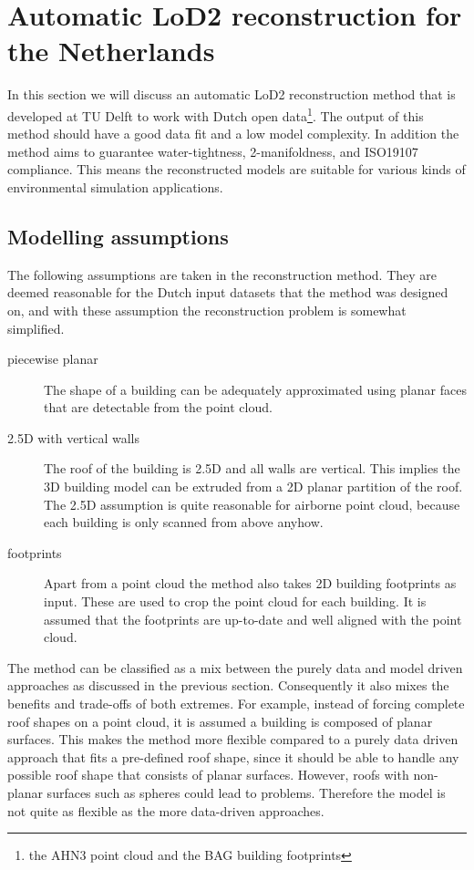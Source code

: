


\section{Automatic LoD2 reconstruction for the Netherlands}
In this section we will discuss an automatic LoD2 reconstruction method that is developed at TU Delft to work with Dutch open data\footnote{the AHN3 point cloud and the BAG building footprints}. 
The output of this method should have a good data fit and a low model complexity.
In addition the method aims to guarantee water-tightness, 2-manifoldness, and ISO19107 compliance. 
This means the reconstructed models are suitable for various kinds of environmental simulation applications.

\subsection{Modelling assumptions}
The following assumptions are taken in the reconstruction method. They are deemed reasonable for the Dutch input datasets that the method was designed on, and with these assumption the reconstruction problem is somewhat simplified.

\begin{description}
	\item[piecewise planar] The shape of a building can be adequately approximated using planar faces that are detectable from the point cloud.
	\item[2.5D with vertical walls] The roof of the building is 2.5D and all walls are vertical. This implies the 3D building model can be extruded from a 2D planar partition of the roof. The 2.5D assumption is quite reasonable for airborne point cloud, because each building is only scanned from above anyhow.
	\item[footprints] Apart from a point cloud the method also takes 2D building footprints as input. These are used to crop the point cloud for each building. It is assumed that the footprints are up-to-date and well aligned with the point cloud.
\end{description}

The method can be classified as a mix between the purely data and model driven approaches as discussed in the previous section. 
Consequently it also mixes the benefits and trade-offs of both extremes.
For example, instead of forcing complete roof shapes on a point cloud, it is assumed a building is composed of planar surfaces.
This makes the method more flexible compared to a purely data driven approach that fits a pre-defined roof shape, since it should be able to handle any possible roof shape that consists of planar surfaces.
However, roofs with non-planar surfaces such as spheres could lead to problems.
Therefore the model is not quite as flexible as the more data-driven approaches.



